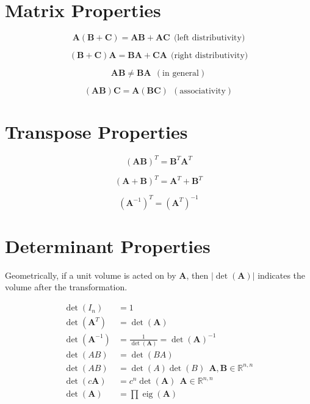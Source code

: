\documentclass{book}
\newcommand{\mA}{\mathbf{A}}
\newcommand{\mB}{\mathbf{B}}
\newcommand{\mC}{\mathbf{C}}
\DeclareMathOperator{\eig}{eig}
\newcommand{\sRnn}{\mathbb{R}^{n,n}}
\begin{document}
\chapter{Matrix Properties}

\begin{equation}
\mA(\mB+\mC)=\mA\mB+\mA\mC~~\textrm{(left distributivity)}
\end{equation}

\begin{equation}
(\mB+\mC)\mA=\mB\mA+\mC\mA~~\textrm{(right distributivity)}
\end{equation}

\begin{equation}
\mA\mB\ne\mB\mA~~(\textrm{in general})
\end{equation}

\begin{equation}
(\mA\mB)\mC=\mA(\mB\mC)~~(\textrm{associativity})
\end{equation}

\chapter{Transpose Properties}

\begin{equation}
(\mA\mB)^T=\mB^T\mA^T
\end{equation}

\begin{equation}
(\mA+\mB)^T=\mA^T+\mB^T
\end{equation}

\begin{equation}
(\mA^{-1})^T=(\mA^T)^{-1}
\end{equation}


\chapter{Determinant Properties}

Geometrically, if a unit volume is acted on by $\mA$, then $|\det(\mA)|$ indicates the volume after the transformation.

\begin{align}
\det(I_n)     &= 1                                  \\
\det(\mA^T)   &= \det(\mA)                          \\
\det(\mA^{-1})&= \frac{1}{\det(\mA)}=\det(\mA)^{-1} \\
\det(AB)      &= \det(BA)                           \\
\det(AB)      &= \det(A)\det(B)~~\mA,\mB\in\sRnn    \\
\det(c\mA)    &= c^n\det(\mA)~~\mA\in\sRnn          \\
\det(\mA)     &= \prod \eig(\mA)                    
\end{align}
\end{document}
